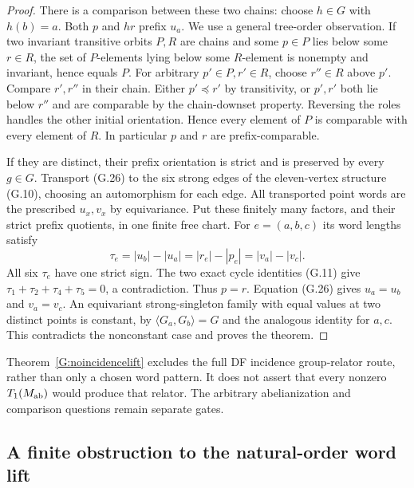 \begin{proof}
There is a comparison between these two chains: choose
$h\in G$ with $h(b)=a$. Both $p$ and $hr$ prefix $u_a$.
We use a general tree-order observation. If two invariant
transitive orbits $P,R$ are chains and some $p\in P$ lies
below some $r\in R$, the set of $P$-elements lying below
some $R$-element is nonempty and invariant, hence equals $P$.
For arbitrary $p'\in P,r'\in R$, choose $r''\in R$ above
$p'$. Compare $r',r''$ in their chain. Either $p'\preceq r'$
by transitivity, or $p',r'$ both lie below $r''$ and are
comparable by the chain-downset property. Reversing the
roles handles the other initial orientation. Hence every
element of $P$ is comparable with every element of $R$.
In particular $p$ and $r$ are prefix-comparable.

If they are distinct, their prefix orientation is strict and
is preserved by every $g\in G$. Transport (G.26) to the six
strong edges of the eleven-vertex structure (G.10), choosing
an automorphism for each edge. All transported point words
are the prescribed $u_x,v_x$ by equivariance. Put these
finitely many factors, and their strict prefix quotients,
in one finite free chart. For $e=(a,b,c)$ its word lengths
satisfy
\[
 \tau_e=|u_b|-|u_a|=|r_e|-|p_e|
       =|v_a|-|v_c|.
\]
All six $\tau_e$ have one strict sign. The two exact cycle
identities (G.11) give
$\tau_1+\tau_2+\tau_4+\tau_5=0$, a contradiction.
Thus $p=r$. Equation (G.26) gives $u_a=u_b$ and $v_a=v_c$.
An equivariant strong-singleton family with equal values at
two distinct points is constant, by
$\langle G_a,G_b\rangle=G$ and the analogous identity for
$a,c$. This contradicts the nonconstant case and proves
the theorem.
\end{proof}

Theorem~\ref{G:noincidencelift} excludes the full DF incidence
group-relator route, rather than only a chosen word pattern.
It does not assert that every nonzero $T_1(M_{\mathrm{ab}})$ would
produce that relator. The arbitrary abelianization and
comparison questions remain separate gates.

\subsection{A finite obstruction to the natural-order word lift}

